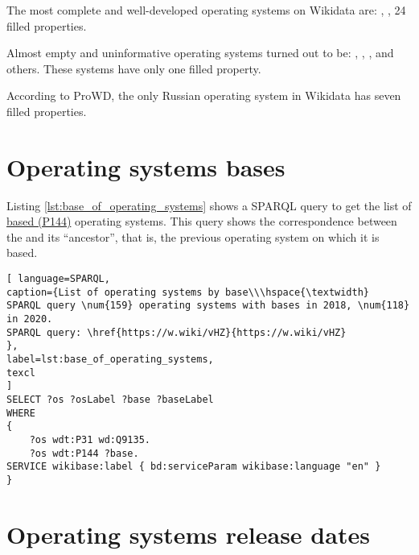The most complete and well-developed operating systems on Wikidata are:  , ,  24 filled properties\cite{prowd_os_link}.

Almost empty and uninformative operating systems turned out to be: , , , and others. These systems have only one filled property\cite{prowd_os_link}.

According to ProWD, the only Russian operating system in Wikidata  has seven filled properties\cite{prowd_os_link_ru}.

\section{Operating systems bases}
Listing \ref{lst:base_of_operating_systems} shows a SPARQL query to get the list of \href{https://www.wikidata.org/wiki/Property_talk:P144}{based (P144)} operating systems. This query shows the correspondence between the  and its ``ancestor'', that is, the previous operating system on which it is based.


\begin{lstlisting}[ language=SPARQL, 
caption={List of operating systems by base\\\hspace{\textwidth}
SPARQL query \num{159} operating systems with bases in 2018, \num{118} in 2020.
SPARQL query: \href{https://w.wiki/vHZ}{https://w.wiki/vHZ}
},
label=lst:base_of_operating_systems,
texcl 
]
SELECT ?os ?osLabel ?base ?baseLabel
WHERE
{
	?os wdt:P31 wd:Q9135.
	?os wdt:P144 ?base.
SERVICE wikibase:label { bd:serviceParam wikibase:language "en" }
}
\end{lstlisting}

\section{Operating systems release dates}

